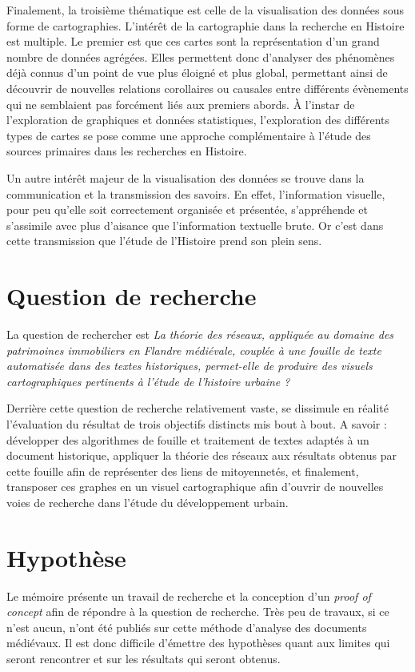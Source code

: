 Finalement, la troisième thématique est celle de la visualisation des données sous forme de cartographies. L’intérêt de la cartographie dans la recherche en Histoire est multiple. Le premier est que ces cartes sont la représentation d’un grand nombre de données agrégées. Elles permettent donc d’analyser des phénomènes déjà connus d’un point de vue plus éloigné et plus global, permettant ainsi de découvrir de nouvelles relations corollaires ou causales entre différents évènements qui ne semblaient pas forcément liés aux premiers abords. À l’instar de l’exploration de graphiques et données statistiques, l’exploration des différents types de cartes se pose comme une approche complémentaire à l’étude des sources primaires dans les recherches en Histoire.

Un autre intérêt majeur de la visualisation des données se trouve dans la communication et la transmission des savoirs. En effet, l’information visuelle, pour peu qu’elle soit correctement organisée et présentée, s’appréhende et s’assimile avec plus d’aisance que l’information textuelle brute. Or c’est dans cette transmission que l’étude de l’Histoire prend son plein sens.

\section{Question de recherche}
 La question de rechercher est \emph{\og La théorie des réseaux, appliquée au domaine des patrimoines immobiliers en Flandre médiévale, couplée à une fouille de texte automatisée dans des textes historiques, permet-elle de produire des visuels cartographiques pertinents à l’étude de l’histoire urbaine ?\fg{}} 
 
 Derrière cette question de recherche relativement vaste, se dissimule en réalité l'évaluation du résultat de trois objectifs distincts mis bout à bout. A savoir : développer des algorithmes de fouille et traitement de textes adaptés à un document historique, appliquer la théorie des réseaux aux résultats obtenus par cette fouille afin de représenter des liens de mitoyennetés, et finalement, transposer ces graphes en un visuel cartographique afin d'ouvrir de nouvelles voies de recherche dans l'étude du développement urbain.
 
\section{Hypothèse}
Le mémoire présente un travail de recherche et la conception d'un \textit{proof of concept} afin de répondre à la question de recherche. Très peu de travaux, si ce n'est aucun, n'ont été publiés sur cette méthode d'analyse des documents médiévaux. Il est donc difficile d'émettre des hypothèses quant aux limites qui seront rencontrer et sur les résultats qui seront obtenus.

